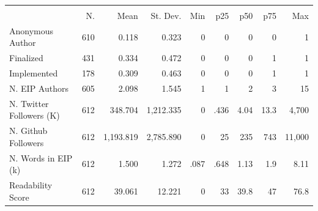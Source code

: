 {
\def\sym#1{\ifmmode^{#1}\else\(^{#1}\)\fi}
\begin{tabular}{l*{1}{rrrrrrrr}}
\hline\hline
                    &\multicolumn{8}{c}{}                                                                                   \\
                    &          N.&        Mean&    St. Dev.&         Min&         p25&         p50&         p75&         Max\\
\hline
Anonymous Author    &         610&       0.118&       0.323&           0&           0&           0&           0&           1\\
Finalized           &         431&       0.334&       0.472&           0&           0&           0&           1&           1\\
Implemented         &         178&       0.309&       0.463&           0&           0&           0&           1&           1\\
N. EIP Authors      &         605&       2.098&       1.545&           1&           1&           2&           3&          15\\
N. Twitter Followers (K)&         612&     348.704&   1,212.335&           0&        .436&        4.04&        13.3&       4,700\\
N. Github Followers &         612&   1,193.819&   2,785.890&           0&          25&         235&         743&      11,000\\
N. Words in EIP (k) &         612&       1.500&       1.272&        .087&        .648&        1.13&         1.9&        8.11\\
Readability Score   &         612&      39.061&      12.221&           0&          33&        39.8&          47&        76.8\\
\hline\hline
\end{tabular}
}
